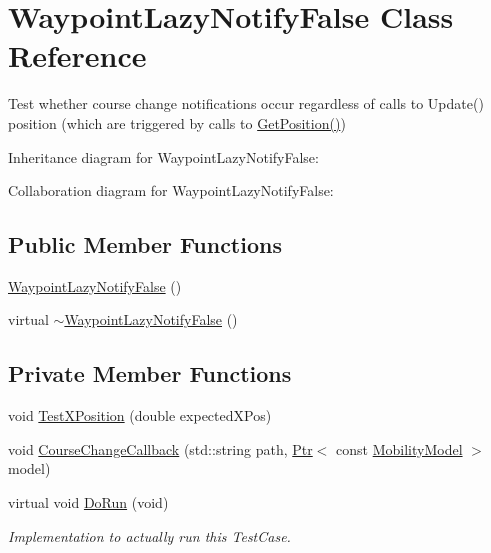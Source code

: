 \hypertarget{classWaypointLazyNotifyFalse}{}\section{Waypoint\+Lazy\+Notify\+False Class Reference}
\label{classWaypointLazyNotifyFalse}


Test whether course change notifications occur regardless of calls to Update() position (which are triggered by calls to \hyperlink{lena-cqi-threshold_8cc_acebf763e1a0478cec225f9547941ae54}{Get\+Position()})  




Inheritance diagram for Waypoint\+Lazy\+Notify\+False\+:


Collaboration diagram for Waypoint\+Lazy\+Notify\+False\+:
\subsection*{Public Member Functions}
\begin{DoxyCompactItemize}
\item 
\hyperlink{classWaypointLazyNotifyFalse_a22a610deb0ceb98ae97a19bf386b4d0d}{Waypoint\+Lazy\+Notify\+False} ()
\item 
virtual \hyperlink{classWaypointLazyNotifyFalse_af73427fd650bfbc552c1b0a998263c1a}{$\sim$\+Waypoint\+Lazy\+Notify\+False} ()
\end{DoxyCompactItemize}
\subsection*{Private Member Functions}
\begin{DoxyCompactItemize}
\item 
void \hyperlink{classWaypointLazyNotifyFalse_a33c0eb59db7d862bf6973ce83024124c}{Test\+X\+Position} (double expected\+X\+Pos)
\item 
void \hyperlink{classWaypointLazyNotifyFalse_a2186d5fd3e8cd850257efa5c2679bdd5}{Course\+Change\+Callback} (std\+::string path, \hyperlink{classns3_1_1Ptr}{Ptr}$<$ const \hyperlink{classns3_1_1MobilityModel}{Mobility\+Model} $>$ model)
\item 
virtual void \hyperlink{classWaypointLazyNotifyFalse_a83d1c83370519f71e39183cfe3450b20}{Do\+Run} (void)
\begin{DoxyCompactList}\small\item\em Implementation to actually run this Test\+Case. \end{DoxyCompactList}\end{DoxyCompactItemize}
